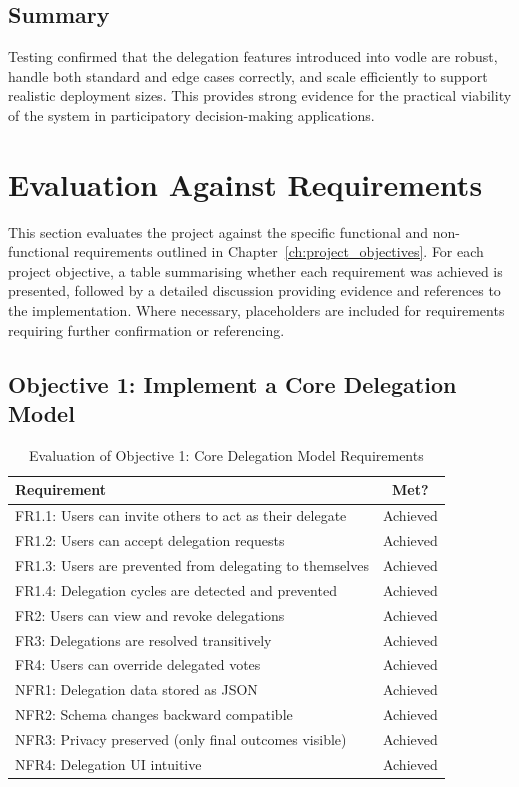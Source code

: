 \subsection*{Summary}
Testing confirmed that the delegation features introduced into vodle are robust, handle both standard and edge cases correctly, and scale efficiently to support realistic deployment sizes. This provides strong evidence for the practical viability of the system in participatory decision-making applications.


\section{Evaluation Against Requirements}

This section evaluates the project against the specific functional and non-functional requirements outlined in Chapter~\ref{ch:project_objectives}. For each project objective, a table summarising whether each requirement was achieved is presented, followed by a detailed discussion providing evidence and references to the implementation. Where necessary, placeholders are included for requirements requiring further confirmation or referencing.

\subsection{Objective 1: Implement a Core Delegation Model}

\begin{table}[H]
\centering
\begin{tabular}{|p{9cm}|c|}
\hline
\textbf{Requirement} & \textbf{Met?} \\ \hline
FR1.1: Users can invite others to act as their delegate & Achieved \\ \hline
FR1.2: Users can accept delegation requests & Achieved \\ \hline
FR1.3: Users are prevented from delegating to themselves & Achieved \\ \hline
FR1.4: Delegation cycles are detected and prevented & Achieved \\ \hline
FR2: Users can view and revoke delegations & Achieved \\ \hline
FR3: Delegations are resolved transitively & Achieved \\ \hline
FR4: Users can override delegated votes & Achieved \\ \hline
NFR1: Delegation data stored as JSON & Achieved \\ \hline
NFR2: Schema changes backward compatible & Achieved \\ \hline
NFR3: Privacy preserved (only final outcomes visible) & Achieved \\ \hline
NFR4: Delegation UI intuitive & Achieved \\ \hline
\end{tabular}
\caption{Evaluation of Objective 1: Core Delegation Model Requirements}
\label{tab:objective1_requirements}
\end{table}

